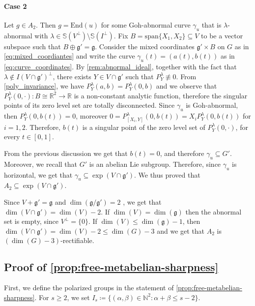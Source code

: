 \documentclass[a4paper,11pt,reqno]{amsart}
\theoremstyle{plain}
\theoremstyle{definition}
\newcommand{\R}{\mathbb R}
\newcommand{\g}{\mathfrak{g}}
\newcommand{\spn}{\mathrm{span}}
\newcommand{\End}{\mathrm{End}}
\begin{document}
\medskip
\paragraph{\textbf{Case 2}} 
Let $g \in A_2$. Then $g = \End(u)$ for some Goh-abnormal curve $\gamma_u$ that is $\lambda$-abnormal with $\lambda \in \mathbb{S}(V^\perp) \setminus \mathbb{S}(I^\perp)$.
     Fix $B = \spn\{X_1,X_2\} \subseteq V$ to be a vector subspace such that $B \oplus \g' =\g$. Consider the mixed coordinates $\g' \times B$ on $G$ as in \eqref{eq:mixed_coordiantes} and write the curve $\gamma_u(t) =(a(t),b(t))$ as in \eqref{eq:curve_coordinates}. By \cref{rem:abnormal_ideal}, together with the fact that $\lambda \notin I(V \cap \g')^\perp$, there exists $Y \in V \cap \g'$ such that $P^\lambda_Y \not\equiv 0$. From \cref{poly_invariance}, we have $P^\lambda_Y(a,b) = P^\lambda_Y(0,b)$ and we observe that $P_Y^\lambda(0,\cdot) \colon B \cong \R^2 \to \R$ is a non-constant analytic function, therefore the singular points of its zero level set are totally disconnected. Since $\gamma_u$ is Goh-abnormal, then $P^\lambda_Y(0,b(t))=0$, moreover $0=P^\lambda_{[X_i,Y]}(0,b(t)) = X_i P^\lambda_Y(0,b(t))$ for $i=1,2$. Therefore, $b(t)$ is a singular point of the zero level set of $P_Y^\lambda(0,\cdot)$, for every $t \in [0,1]$. 
    
    From the previous discussion we get that $b(t)=0$, and therefore $\gamma_u \subseteq G'$. Moreover, we recall that $G'$ is an abelian Lie subgroup. Therefore, since $\gamma_u$ is horizontal, we get that $\gamma_u \subseteq \exp(V \cap \g')$. We thus proved that $A_2 \subseteq \exp(V \cap \g')$.
     
    Since $V + \g'= \g$ and $\dim(\g/\g')=2$ , we get that $\dim(V \cap \g')=\dim(V)-2$. If $\dim(V)=\dim(\g)$ then the abnormal set is empty, since $V^\perp = \{0\}$. If $\dim(V) \le \dim(\g) - 1$, then $\dim(V \cap \g') = \dim(V)-2 \le \dim(G) - 3$ and we get that $A_2$ is  $(\dim(G)-3)$-rectifiable. \hfill \qedsymbol

\subsection{Proof of \cref{prop:free-metabelian-sharpness}}

First, we define the polarized groups in the statement of \cref{prop:free-metabelian-sharpness}. For $s \ge 2$, we set $I_s \coloneq  \{(\alpha,\beta)\in\mathbb N^2:\alpha + \beta \leq s-2\}$.
\end{document}
